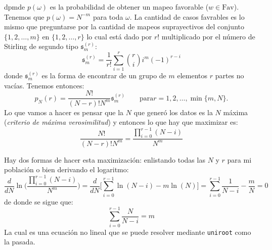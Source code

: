 \documentclass[
]{book}
\newenvironment{Shaded}{\begin{snugshade}}{\end{snugshade}}
\newcommand{\AttributeTok}[1]{\textcolor[rgb]{0.77,0.63,0.00}{#1}}
\newcommand{\CommentTok}[1]{\textcolor[rgb]{0.56,0.35,0.01}{\textit{#1}}}
\newcommand{\ControlFlowTok}[1]{\textcolor[rgb]{0.13,0.29,0.53}{\textbf{#1}}}
\newcommand{\DecValTok}[1]{\textcolor[rgb]{0.00,0.00,0.81}{#1}}
\newcommand{\FunctionTok}[1]{\textcolor[rgb]{0.00,0.00,0.00}{#1}}
\newcommand{\NormalTok}[1]{#1}
\newcommand{\OtherTok}[1]{\textcolor[rgb]{0.56,0.35,0.01}{#1}}
\newcommand{\SpecialCharTok}[1]{\textcolor[rgb]{0.00,0.00,0.00}{#1}}
\begin{document}
dpmde \(p(\omega)\) es la probabilidad de obtener un mapeo favorable (\(w\in\text{Fav}\)). Tenemos que \(p(\omega) = N^{-m}\) para toda \(\omega\). La cantidad de casos favrables es lo mismo que preguntarse por la cantidad de mapeos suprayectivos del conjunto \(\{1,2,\dots, m\}\) en \(\{1,2,\dots, r\}\) lo cual está dado por \(r!\) multiplicado por el número de Stirling de segundo tipo \(\mathfrak{s}_m^{(r)}\):
\[
\mathfrak{s}_m^{(r)} = \frac{1}{r!} \sum\limits_{i = 1}^r \binom{r}{i} i^m (-1)^{r-i}
\]
donde \(\mathfrak{s}_m^{(r)}\) es la forma de encontrar de un grupo de \(m\) elementos \(r\) partes no vacías. Tenemos entonces:
\[
p_N(r) = \dfrac{N!}{(N-r)!N^m} \mathfrak{s}_m^{(r)} \qquad \text{para} r = 1,2,\dots,\min\{m,N\}.
\]
Lo que vamos a hacer es pensar que la \(N\) que generó los datos es la \(N\) máxima (\emph{criterio de máxima verosimilitud}) y entonces lo que hay que maximizar es:
\[
 \dfrac{N!}{(N-r)!N^m} = \dfrac{\prod_{i = 0}^{r -1} (N-i)}{N^m}
\]

Hay dos formas de hacer esta maximización: enlistando todas las \(N\) y \(r\) para mi población o bien derivando el logaritmo:
\[
\dfrac{d}{dN}  \ln \Bigg( \dfrac{\prod_{i = 0}^{r -1} (N-i)}{N^m}\Bigg) = \dfrac{d}{dN}\Bigg[ \sum\limits_{i = 0}^{r-1} \ln(N-i)  - m\ln (N) \Bigg] = \sum\limits_{i = 0}^{r-1} \dfrac{1}{N-i} - \dfrac{m}{N} = 0
\]
de donde se sigue que:
\[
\sum\limits_{i = 0}^{r-1} \dfrac{N}{N-i} = m
\]
La cual es una ecuación no lineal que se puede resolver mediante \texttt{uniroot} como la pasada.

\begin{Shaded}
\end{Shaded}
\end{document}
